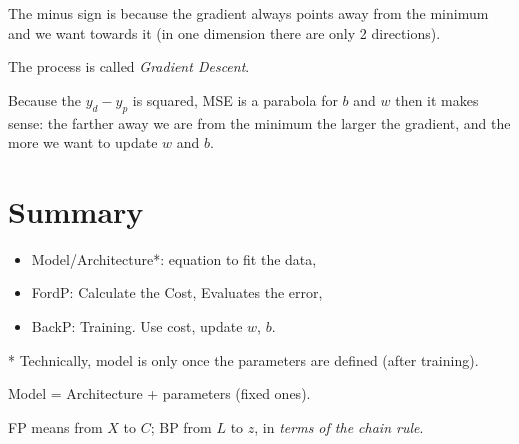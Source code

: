 \documentclass[14pt]{article}
\begin{document}
The minus sign is because the gradient always points away from the minimum and we want towards it (in one dimension there are only 2 directions). 

The process is called \textit{Gradient Descent}.

Because the $y_d - y_p$ is squared, MSE is a parabola for $b$ and $w$ then it makes sense: the farther away we are from the minimum the larger the gradient, and the more we want to update $w$ and $b$.






\section{Summary}

\begin{itemize}
 \item Model/Architecture*: equation to fit the data,
 \item FordP: Calculate the Cost, Evaluates the error,
 \item BackP: Training. Use cost, update $w$, $b$.
\end{itemize}
* Technically, model is only once the parameters are defined (after training). 
\begin{center}
Model =  Architecture + parameters (fixed ones). 
\end{center}

FP means from $X$ to $C$; BP from $L$ to $z$, in \textit{terms of the chain rule}.

\end{document}
